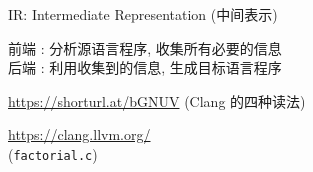 
\begin{frame}{}
\end{frame}

\begin{frame}{}
  \begin{center}
    \begin{columns}
    \end{columns}
  \end{center}
\end{frame}

\begin{frame}{}
  \begin{center}
    IR: Intermediate Representation (中间表示)
    \vspace{0.50cm}


    \vspace{0.50cm}
    前端 : 分析源语言程序, 收集所有必要的信息 \\[8pt]
    后端 : 利用收集到的信息, 生成目标语言程序
  \end{center}
\end{frame}

\begin{frame}{}
\end{frame}

\begin{frame}{}
\end{frame}

\begin{frame}{}
  \begin{center}
    \url{https://shorturl.at/bGNUV} (Clang 的四种读法)


    \vspace{0.30cm}
    \url{https://clang.llvm.org/}\\[5pt]

    \pause
    (\texttt{factorial.c})
  \end{center}
\end{frame}

